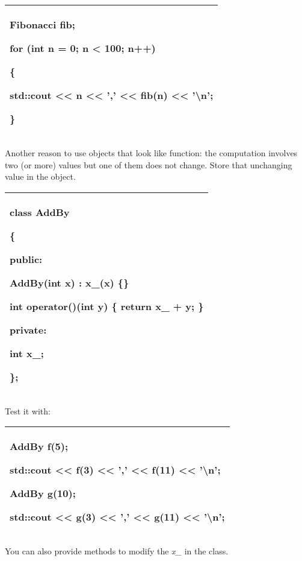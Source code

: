 \documentclass[
]{article}
\begin{document}
\begin{longtable}[]{@{}l@{}}
\toprule
\endhead
\begin{minipage}[t]{0.97\columnwidth}\raggedright
Fibonacci fib;

for (int n = 0; n \textless{} 100; n++)

\{

std::cout \textless\textless{} n \textless\textless{} ','
\textless\textless{} fib(n) \textless\textless{} '\textbackslash n';

\}\strut
\end{minipage}\tabularnewline
\bottomrule
\end{longtable}

Another reason to use objects that look like function: the computation
involves two (or more) values but one of them does not change. Store
that unchanging value in the object.

\begin{longtable}[]{@{}l@{}}
\toprule
\endhead
\begin{minipage}[t]{0.97\columnwidth}\raggedright
class AddBy

\{

public:

AddBy(int x) : x\_(x) \{\}

int operator()(int y) \{ return x\_ + y; \}

private:

int x\_;

\};\strut
\end{minipage}\tabularnewline
\bottomrule
\end{longtable}

Test it with:

\begin{longtable}[]{@{}l@{}}
\toprule
\endhead
\begin{minipage}[t]{0.97\columnwidth}\raggedright
AddBy f(5);

std::cout \textless\textless{} f(3) \textless\textless{} ','
\textless\textless{} f(11) \textless\textless{} '\textbackslash n';

AddBy g(10);

std::cout \textless\textless{} g(3) \textless\textless{} ','
\textless\textless{} g(11) \textless\textless{}
'\textbackslash n';\strut
\end{minipage}\tabularnewline
\bottomrule
\end{longtable}

You can also provide methods to modify the \emph{x\_} in the class.
\end{document}
